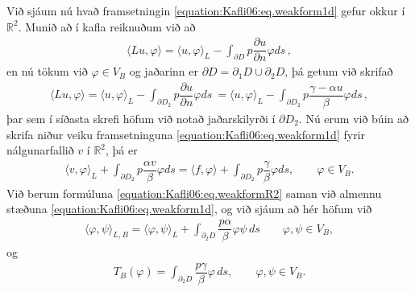 \documentclass[a4paper,10pt,icelandic]{sphinxmanual}
\begin{document}
Við sjáum nú hvað framsetningin \eqref{equation:Kafli06:eq.weakform1d} gefur okkur í \(\mathbb{R}^2\).
Munið að í kafla {\hyperref[\detokenize{Kafli06:ch-6-1-2}]{}} reiknuðum við að
\begin{equation*}
\begin{split}\langle L u, \varphi\rangle= \langle u, \varphi\rangle_L - \int_{\partial D} p \dfrac{\partial u}{\partial n} \varphi ds\,,\end{split}
\end{equation*}
en nú tökum við \(\varphi \in V_B\) og jaðarinn er \(\partial D=\partial_1D\cup \partial_2 D\), þá getum við skrifað
\begin{equation*}
\begin{split}\langle L u, \varphi\rangle= \langle u, \varphi\rangle_L - \int_{\partial D_2} p \dfrac{\partial u}{\partial n} \varphi ds\ =
\langle u, \varphi\rangle_L - \int_{\partial D_2} p \dfrac{\gamma -\alpha u}{\beta} \varphi ds\,,\end{split}
\end{equation*}
þar sem í síðasta skrefi höfum við notað jaðarskilyrði í \(\partial D_2\). Nú erum við búin að skrifa niður veiku framsetninguna \eqref{equation:Kafli06:eq.weakform1d} fyrir nálgunarfallið \(v\) í \(\mathbb{R}^2\), þá er
\begin{equation}\label{equation:Kafli06:eq.weakformR2}
\begin{split}\langle v, \varphi\rangle_L + \int_{\partial D_2} p \dfrac{\alpha v}{\beta} \varphi ds = \langle f, \varphi\rangle + \int_{\partial D_2} p \dfrac{\gamma}{\beta} \varphi ds, \qquad \varphi\in V_B.\end{split}
\end{equation}
Við berum formúluna \eqref{equation:Kafli06:eq.weakformR2} saman við almennu stæðuna \eqref{equation:Kafli06:eq.weakform1d}, og við sjáum að hér höfum við
\begin{equation*}
\begin{split}{\langle \varphi,\psi\rangle}_{L,B}=
{{\langle \varphi,\psi\rangle}}_L+\int_{\partial_2D}\dfrac{p\alpha}\beta \varphi\psi\, ds\qquad \varphi,\psi\in V_B,\end{split}
\end{equation*}
og
\begin{equation*}
\begin{split}T_B(\varphi)=\int_{\partial_2D}\dfrac{p\gamma}\beta \varphi\, ds,
\qquad \varphi,\psi\in V_B.\end{split}
\end{equation*}
\end{document}
